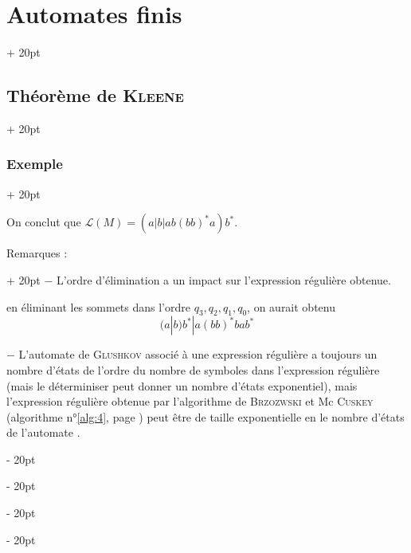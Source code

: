 \documentclass[a4paper, 12pt, twoside]{article}
\newcommand{\ind}[1][20pt]{\advance\leftskip + #1}
\newcommand{\deind}[1][20pt]{\advance\leftskip - #1}
\newenvironment{indt}[2][20pt]{#2 \par \ind[#1]}{\par \deind} %
\begin{document}
\begin{indt}{\section{Automates finis}}
\begin{indt}{\subsection{Théorème de \textsc{Kleene}}}
\begin{indt}{\subsubsection{Exemple}}
\begin{center}
                \end{center}

                \vspace{6pt}
                
                On conclut que $\mathcal L(M) = (a|b|ab(bb)^*a)b^*$.

                \vspace{12pt}
                
                \begin{indt}{Remarques :}
                    $-$ L'ordre d'élimination a un impact sur l'expression régulière obtenue.

                     en éliminant les sommets dans l'ordre $q_3, q_2, q_1, q_0$, on aurait obtenu
                    \[
                        (a|b)b^* | a(bb)^*bab^*
                    \]

                    \vspace{6pt}
                    
                    $-$ L'automate de \textsc{Glushkov} associé à une expression régulière a toujours un nombre d'états de l'ordre du nombre de symboles dans l'expression régulière (mais le déterminiser peut donner un nombre d'états exponentiel), mais l'expression régulière obtenue par l'algorithme de \textsc{Brzozwski} et Mc \textsc{Cuskey} (algorithme n°\ref{alg:4}, page \pageref{alg:4}) peut être de taille exponentielle en le nombre d'états de l'automate .
                \end{indt}
            \end{indt}
        \end{indt}
    \end{indt}
    
\end{document}
